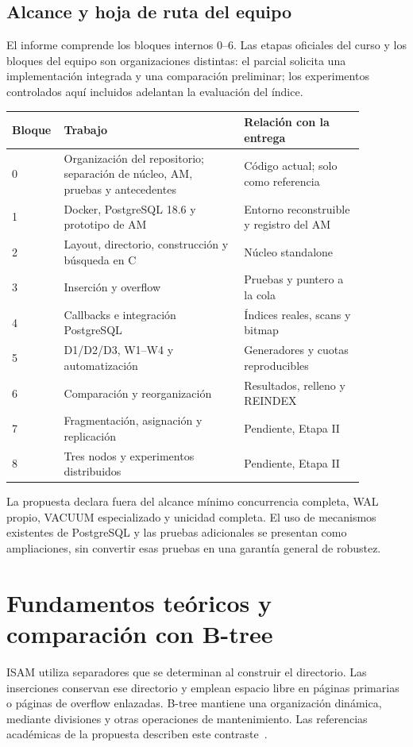 \documentclass[11pt,a4paper]{article}
\newcommand{\code}[1]{\texttt{\detokenize{#1}}}
\begin{document}
\subsection{Alcance y hoja de ruta del equipo}

El informe comprende los bloques internos 0--6. Las etapas oficiales del curso
y los bloques del equipo son organizaciones distintas: el parcial solicita una
implementación integrada y una comparación preliminar; los experimentos
controlados aquí incluidos adelantan la evaluación del índice.

\begin{longtable}{P{0.08\linewidth}P{0.48\linewidth}P{0.32\linewidth}}
\toprule
Bloque & Trabajo & Relación con la entrega\\
 & Organización del repositorio; separación de núcleo, AM, pruebas y antecedentes
  & Código actual; \code{legacy/} solo como referencia\\
1 & Docker, PostgreSQL 18.6 y prototipo de AM
  & Entorno reconstruible y registro del AM\\
2 & Layout, directorio, construcción y búsqueda en C
  & Núcleo standalone\\
3 & Inserción y overflow
  & Pruebas y puntero a la cola\\
4 & Callbacks e integración PostgreSQL
  & Índices reales, scans y bitmap\\
5 & D1/D2/D3, W1--W4 y automatización
  & Generadores y cuotas reproducibles\\
6 & Comparación y reorganización
  & Resultados, relleno y REINDEX\\
7 & Fragmentación, asignación y replicación
  & Pendiente, Etapa II\\
8 & Tres nodos y experimentos distribuidos
  & Pendiente, Etapa II\\
\bottomrule
\end{longtable}

La propuesta declara fuera del alcance mínimo concurrencia completa, WAL propio,
VACUUM especializado y unicidad completa. El uso de mecanismos existentes de
PostgreSQL y las pruebas adicionales se presentan como ampliaciones, sin convertir
esas pruebas en una garantía general de robustez.

\section{Fundamentos teóricos y comparación con B-tree}

ISAM utiliza separadores que se determinan al construir el directorio. Las
inserciones conservan ese directorio y emplean espacio libre en páginas primarias
o páginas de overflow enlazadas. B-tree mantiene una organización dinámica,
mediante divisiones y otras operaciones de mantenimiento. Las referencias
académicas de la propuesta describen este
contraste~\cite{ramakrishnan,silberschatz,silberschatz2014}.
\end{document}
